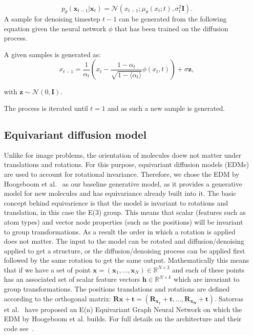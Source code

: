 \documentclass[journal=jacsat,manuscript=article]{achemso}
\begin{document}
\begin{equation}
p_{\theta}(\mathbf{x}_{t-1}|\mathbf{x}_t)=\mathcal{N}(x_{t-1}; \mu_{\theta}(x_t;t), \sigma_t^2\mathbf{I}).
\end{equation}
A sample for denoising timestep $t-1$ can be generated from the following equation given the neural network $\phi$ that has been trained on the diffusion process. 

A given samples is generated as:
\begin{equation}
 x_{t-1} = \frac{1}{\alpha_t}(x_t-\frac{1-\alpha_t}{\sqrt{1-\langle\alpha_t\rangle}}\phi(x_t,t)) +\sigma \mathbf{z},   
\end{equation}

with $\mathbf{z}\sim\mathcal{N}(0,\mathbf{I})$.

The process is iterated until $t=1$ and as such a new sample is generated. 

\subsection*{Equivariant diffusion model}
Unlike for image problems, the orientation of molecules doew not matter under translations and rotations. For this purpose, equivariant diffusion models (EDMs) are used to account for rotational invariance. Therefore, we chose the EDM by Hoogeboom et al.~\cite{hoogeboom2022equivariant} as our baseline generative model, as it provides a generative model for new molecules and has equivariance already built into it. The basic concept behind equivarience is that the model is invariant to rotations and translation, in this case the E(3) group. This means that scalar (features such as atom types) and vector node properties (such as the positions) will be invariant to group transformations. As a result the order in which a rotation is applied does not matter. The input to the model can be rotated and diffusion/denoising  applied to get a structure, or the diffusion/denoising process can be applied first followed by the same rotation to get the same output. 
Mathematically this means that if we have a set of point $\mathbf{x} = (\mathbf{x}_1,\ldots,\mathbf{x}_N) \in \mathbb{R}^{N\times 3}$ and each of these points has an associated set of scalar feature vectors $\mathbf{h}\in \mathbb{R}^{N\times k}$ which are invariant to group transformations. The positions translations and rotations are defined according to the orthogonal matrix: $\mathbf{Rx + t} = (\mathbf{R_{x_1}+t},\ldots, \mathbf{R_{x_N}+t})$. Satorras et al.~\cite{satorras2022equivariant} have proposed an E(n) Equivariant Graph Neural Network on which the EDM by Hoogeboom et al. builds. For full details on the architecture and their code see~\cite{hoogeboom2022equivariant}. 
\end{document}
